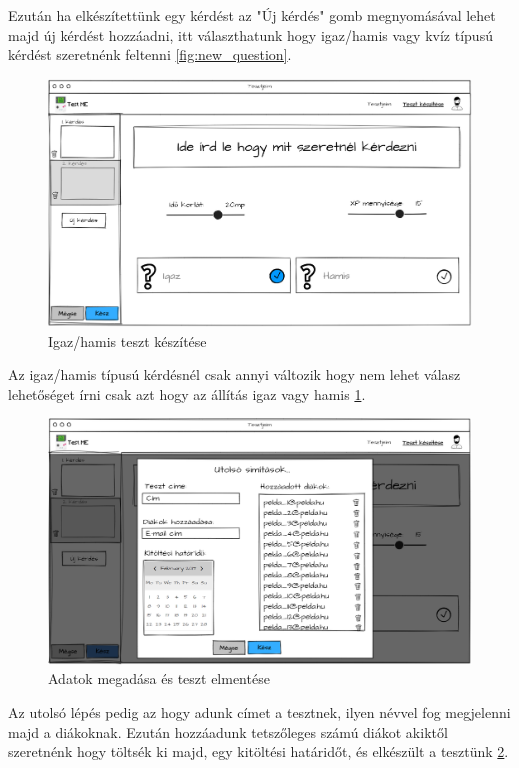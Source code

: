 Ezután ha elkészítettünk egy kérdést az "Új kérdés" gomb megnyomásával lehet majd új kérdést hozzáadni, itt választhatunk hogy igaz/hamis vagy kvíz típusú kérdést szeretnénk feltenni \ref{fig:new_question}.

\begin{figure}[H]
    \centering
    \includegraphics[width=\linewidth]{images/make_test3_wireframe.png}
    \caption{Igaz/hamis teszt készítése}
    \label{fig:test_true_false}
\end{figure}

Az igaz/hamis típusú kérdésnél csak annyi változik hogy nem lehet válasz lehetőséget írni csak azt hogy az állítás igaz vagy hamis \ref{fig:test_true_false}.

\begin{figure}[H]
    \centering
    \includegraphics[width=\linewidth]{images/make_test4_wireframe.png}
    \caption{Adatok megadása és teszt elmentése}
    \label{fig:save_test}
\end{figure}

Az utolsó lépés pedig az hogy adunk címet a tesztnek, ilyen névvel fog megjelenni majd a diákoknak. Ezután hozzáadunk tetszőleges számú diákot akiktől szeretnénk hogy töltsék ki majd, egy kitöltési határidőt, és elkészült a tesztünk \ref{fig:save_test}.

